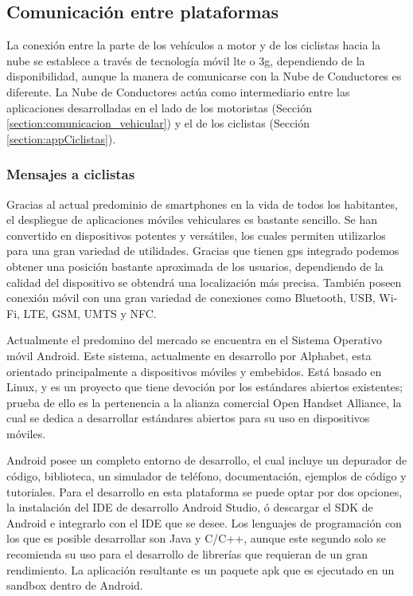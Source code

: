 \subsection{Comunicación entre plataformas}\label{ssection:comunicacion_plataformas}
La conexión entre la parte de los vehículos a motor y de los ciclistas hacia la nube se establece a través de tecnología móvil \gls{lte} o \gls{3g}, dependiendo de la disponibilidad, aunque la manera de comunicarse con la Nube de Conductores es diferente. La Nube de Conductores actúa como intermediario entre las aplicaciones desarrolladas en el lado de los motoristas (Sección \ref{section:comunicacion_vehicular}) y el de los ciclistas (Sección \ref{section:appCiclistas}).

\subsubsection{Mensajes a ciclistas}\label{sssection:mensajes_ciclistas}
Gracias al actual predominio de smartphones en la vida de todos los habitantes, el despliegue de aplicaciones móviles vehiculares es bastante sencillo. Se han convertido en dispositivos potentes y versátiles, los cuales permiten utilizarlos para una gran variedad de utilidades. Gracias que tienen \gls{gps} integrado podemos obtener una posición bastante aproximada de los usuarios, dependiendo de la calidad del dispositivo se obtendrá una localización más precisa. También poseen conexión móvil con una gran variedad de conexiones como Bluetooth, USB, Wi-Fi, LTE, GSM, UMTS y NFC.

Actualmente el predomino del mercado se encuentra en el Sistema Operativo móvil Android. Este sistema, actualmente en desarrollo por Alphabet, esta orientado principalmente a dispositivos móviles y embebidos. Está basado en Linux, y es un proyecto que tiene devoción por los estándares abiertos existentes; prueba de ello es la pertenencia a la alianza comercial Open Handset Alliance, la cual se dedica a desarrollar estándares abiertos para su uso en dispositivos móviles.

Android posee un completo entorno de desarrollo, el cual incluye un depurador de código, biblioteca, un simulador de teléfono, documentación, ejemplos de código y tutoriales. Para el desarrollo en esta plataforma se puede optar por dos opciones, la instalación del IDE de desarrollo Android Studio, ó descargar el SDK de Android e integrarlo con el IDE que se desee. Los lenguajes de programación con los que es posible desarrollar son Java y C/C++, aunque este segundo solo se recomienda su uso para el desarrollo de librerías que requieran de un gran rendimiento. La aplicación resultante es un paquete apk que es ejecutado en un sandbox dentro de Android.

